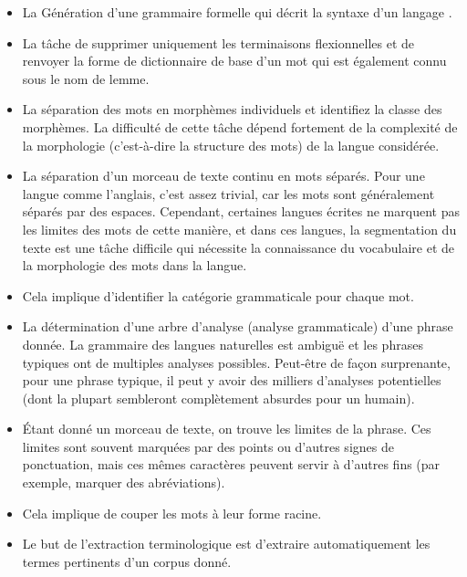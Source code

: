 \begin{itemize}

    \item {}
          La Génération d'une grammaire formelle qui décrit la syntaxe d'un langage \cite{klein2002natural}.
    \item {}
          La tâche de supprimer uniquement les terminaisons flexionnelles et de renvoyer la forme de dictionnaire de base d'un mot qui est également connu sous le nom de lemme.
    \item {}
          La séparation des mots en morphèmes individuels et identifiez la classe des morphèmes. La difficulté de cette tâche dépend fortement de la complexité de la morphologie (c'est-à-dire la structure des mots) de la langue considérée.
    \item {}
          La séparation d'un morceau de texte continu en mots séparés. Pour une langue comme l'anglais, c'est assez trivial, car les mots sont généralement séparés par des espaces. Cependant, certaines langues écrites ne marquent pas les limites des mots de cette manière, et dans ces langues, la segmentation du texte est une tâche difficile qui nécessite la connaissance du vocabulaire et de la morphologie des mots dans la langue.
    \item {}
          Cela implique d'identifier la catégorie grammaticale pour chaque mot.
    \item {}
          La détermination d'une arbre d'analyse (analyse grammaticale) d'une phrase donnée. La grammaire des langues naturelles est ambiguë et les phrases typiques ont de multiples analyses possibles. Peut-être de façon surprenante, pour une phrase typique, il peut y avoir des milliers d'analyses potentielles (dont la plupart sembleront complètement absurdes pour un humain).
    \item {}
          Étant donné un morceau de texte, on trouve les limites de la phrase. Ces limites sont souvent marquées par des points ou d'autres signes de ponctuation, mais ces mêmes caractères peuvent servir à d'autres fins (par exemple, marquer des abréviations).
    \item {}
          Cela implique de couper les mots à leur forme racine.
    \item {}
          Le but de l'extraction terminologique est d'extraire automatiquement les termes pertinents d'un corpus donné.
\end{itemize}

